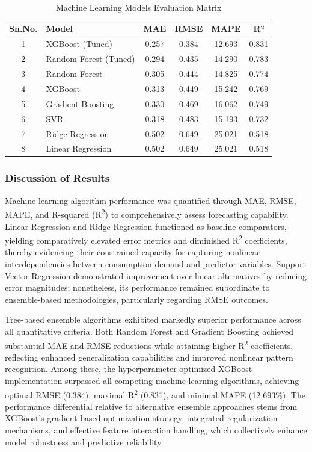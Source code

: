 \documentclass[oneside, 12pt]{book}
\numberwithin{equation}{chapter}
\begin{document}
\begin{table}[H]
\centering
\caption{Machine Learning Models Evaluation Matrix}
\label{tab:ml_results}
\begin{tabular}{|c|l|c|c|c|c|}
\hline
\textbf{Sn.No.} & \textbf{Model} & \textbf{MAE} & \textbf{RMSE} & \textbf{MAPE} & \textbf{R²} \\
\hline
1 & XGBoost (Tuned) & 0.257 & 0.384 & 12.693 & 0.831 \\
\hline
2 & Random Forest (Tuned) & 0.294 & 0.435 & 14.290 & 0.783 \\
\hline
3 & Random Forest & 0.305 & 0.444 & 14.825 & 0.774 \\
\hline
4 & XGBoost & 0.313 & 0.449 & 15.242 & 0.769 \\
\hline
5 & Gradient Boosting & 0.330 & 0.469 & 16.062 & 0.749 \\
\hline
6 & SVR & 0.318 & 0.483 & 15.193 & 0.732 \\
\hline
7 & Ridge Regression & 0.502 & 0.649 & 25.021 & 0.518 \\
\hline
8 & Linear Regression & 0.502 & 0.649 & 25.021 & 0.518 \\
\hline
\end{tabular}
\end{table}

\subsubsection{Discussion of Results}

Machine learning algorithm performance was quantified through MAE, RMSE, MAPE, and R-squared (R\textsuperscript{2}) to comprehensively assess forecasting capability. Linear Regression and Ridge Regression functioned as baseline comparators, yielding comparatively elevated error metrics and diminished R\textsuperscript{2} coefficients, thereby evidencing their constrained capacity for capturing nonlinear interdependencies between consumption demand and predictor variables. Support Vector Regression demonstrated improvement over linear alternatives by reducing error magnitudes; nonetheless, its performance remained subordinate to ensemble-based methodologies, particularly regarding RMSE outcomes.

Tree-based ensemble algorithms exhibited markedly superior performance across all quantitative criteria. Both Random Forest and Gradient Boosting achieved substantial MAE and RMSE reductions while attaining higher R\textsuperscript{2} coefficients, reflecting enhanced generalization capabilities and improved nonlinear pattern recognition. Among these, the hyperparameter-optimized XGBoost implementation surpassed all competing machine learning algorithms, achieving optimal RMSE (0.384), maximal R\textsuperscript{2} (0.831), and minimal MAPE (12.693\%). The performance differential relative to alternative ensemble approaches stems from XGBoost's gradient-based optimization strategy, integrated regularization mechanisms, and effective feature interaction handling, which collectively enhance model robustness and predictive reliability.
\end{document}
